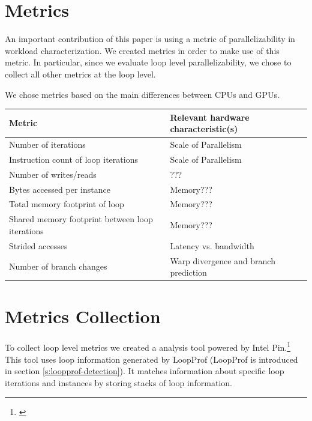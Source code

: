 \documentclass[12pt,twoside]{reedthesis}
\begin{document}
	
	\section{Metrics}
		
		An important contribution of this paper is using a metric of parallelizability in workload characterization. 
		We created metrics in order to make use of this metric. 
		In particular, since we evaluate loop level parallelizability, we chose to collect all other metrics at the loop level. 
		
		We chose metrics based on the main differences between CPUs and GPUs. 
		
		\begin{tabular}{ |p{6cm}|p{7cm}| }
			\hline
			Metric & Relevant hardware characteristic(s) \\
			\hline \hline
			Number of iterations & Scale of Parallelism \\
			\hline
			Instruction count of loop iterations  & Scale of Parallelism \\
			\hline
			Number of writes/reads & ??? \\
			\hline
			Bytes accessed per instance & Memory??? \\
			\hline
			Total memory footprint of loop & Memory???  \\
			\hline
			Shared memory footprint between loop iterations & Memory??? \\
			\hline
			Strided accesses  & Latency vs. bandwidth \\
			\hline
			Number of branch changes & Warp divergence and branch prediction \\
			\hline
		\end{tabular}
	



	\section{Metrics Collection}
	
		To collect loop level metrics we created a analysis tool powered by Intel Pin.\footnote{\cite{Luk:2005}} This tool uses loop information generated by LoopProf (LoopProf is introduced in section \ref{s:loopprof-detection}). It matches information about specific loop iterations and instances by storing stacks of loop information. 
		
\end{document}
